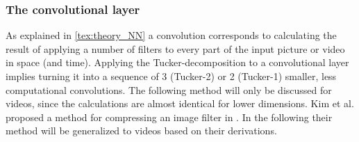 \subsubsection{The convolutional layer}
As explained in \autoref{tex:theory_NN} a convolution corresponds to calculating the result of applying a number of filters to every part of the input picture or video in space (and time). Applying the Tucker-decomposition to a convolutional layer implies turning it into a sequence of 3 (Tucker-2) or 2 (Tucker-1) smaller, less computational convolutions. The following method will only be discussed for videos, since the calculations are almost identical for lower dimensions. Kim et al. proposed a method for compressing an image filter in \cite{Kim2016}. In the following their method will be generalized to videos based on their derivations.

